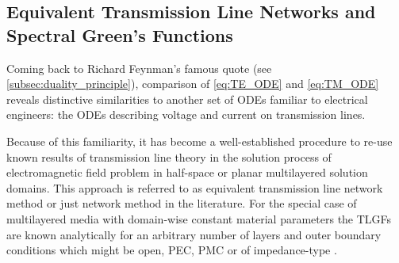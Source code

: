 \subsection{Equivalent Transmission Line Networks and Spectral Green's Functions}
\label{subsec:tl_greens_functions}

Coming back to Richard Feynman's famous quote (see
\cref{subsec:duality_principle}), comparison of \eqref{eq:TE_ODE} and
\eqref{eq:TM_ODE} reveals distinctive similarities to another set of
\acp{ODE} familiar to electrical engineers: the \acp{ODE} describing 
voltage and current on transmission lines. 

Because of this familiarity, it has become a well-established procedure to
re-use known results of transmission line theory in the solution process of
electromagnetic field problem in half-space or planar multilayered solution
domains.
This approach is referred to as equivalent transmission line network method or
just network method in the literature.
For the special case of multilayered media with domain-wise constant material
parameters the \acp{TLGF} are known analytically for an arbitrary number of
layers and outer boundary conditions which might be open, \ac{PEC}, \ac{PMC}
or of impedance-type \cite[Section~2.4]{Felsen1994}\cite{Michalski1990,
Eibert1997,Michalski2005,Michalski2016b}.

